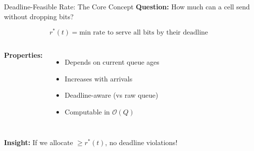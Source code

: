 \documentclass[aspectratio=169]{beamer}
\begin{document}
\begin{frame}{Deadline-Feasible Rate: The Core Concept}
\textbf{Question:} How much can a cell send without dropping bits?

\begin{definition}
\vspace{-0.3cm}
\begin{equation*}
r^*(t) = \text{min rate to serve all bits by their deadline}
\end{equation*}
\end{definition}

\begin{columns}
\textbf{Properties:}
\begin{itemize}
    \item Depends on current queue ages
    \item Increases with arrivals
    \item Deadline-aware (vs raw queue)
    \item Computable in $\mathcal{O}(Q)$
\end{itemize}

\end{columns}

\vspace{0.3cm}
\textbf{Insight:} If we allocate $\geq r^*(t)$, no deadline violations!
\end{frame}
\end{document}
